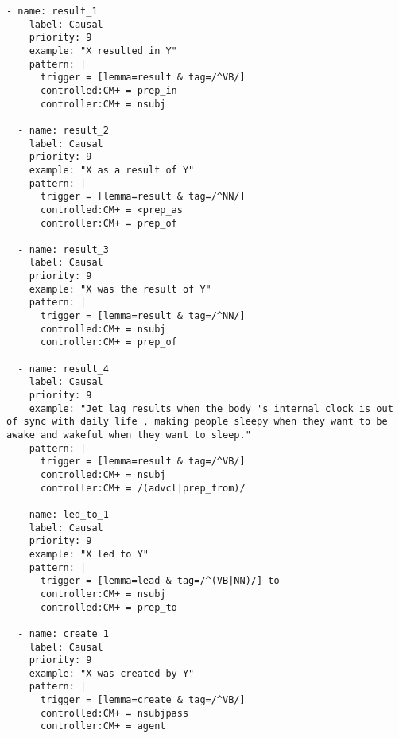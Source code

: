 \begin{singlespace}
\begin{small}
\begin{lstlisting}[caption={Rules for causal relations (events).  Note that the cause and effect arguments are previously found causal mentions.}]
  - name: result_1
    label: Causal
    priority: 9
    example: "X resulted in Y"
    pattern: |
      trigger = [lemma=result & tag=/^VB/]
      controlled:CM+ = prep_in
      controller:CM+ = nsubj

  - name: result_2
    label: Causal
    priority: 9
    example: "X as a result of Y"
    pattern: |
      trigger = [lemma=result & tag=/^NN/]
      controlled:CM+ = <prep_as
      controller:CM+ = prep_of

  - name: result_3
    label: Causal
    priority: 9
    example: "X was the result of Y"
    pattern: |
      trigger = [lemma=result & tag=/^NN/]
      controlled:CM+ = nsubj
      controller:CM+ = prep_of

  - name: result_4
    label: Causal
    priority: 9
    example: "Jet lag results when the body 's internal clock is out of sync with daily life , making people sleepy when they want to be awake and wakeful when they want to sleep."
    pattern: |
      trigger = [lemma=result & tag=/^VB/]
      controlled:CM+ = nsubj
      controller:CM+ = /(advcl|prep_from)/

  - name: led_to_1
    label: Causal
    priority: 9
    example: "X led to Y"
    pattern: |
      trigger = [lemma=lead & tag=/^(VB|NN)/] to
      controller:CM+ = nsubj
      controlled:CM+ = prep_to

  - name: create_1
    label: Causal
    priority: 9
    example: "X was created by Y"
    pattern: |
      trigger = [lemma=create & tag=/^VB/]  
      controlled:CM+ = nsubjpass
      controller:CM+ = agent

\end{lstlisting}
\end{small}
\end{singlespace}

